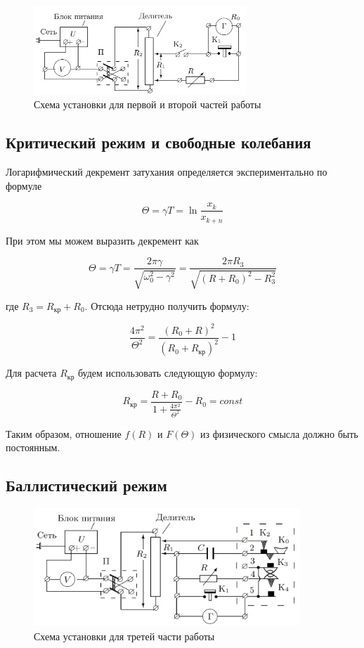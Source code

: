 \documentclass[a4paper,12pt]{article}
\begin{document}
\begin{figure} 
    \includegraphics[width=8cm]{scheme1}
    \caption{Схема установки для первой и второй частей работы}
    \label{chain1}
\end{figure}

\subsection{Критический режим и свободные колебания}

Логарифмический декремент затухания определяется экспериментально по формуле

\begin{equation}\label{Theta}
    \Theta =  \gamma T =  \ln \dfrac{x_k}{x_{k+n}}
\end{equation}

При этом мы можем 
выразить декремент как

\begin{equation}\label{}
    \Theta =  \gamma T =  \dfrac{2\pi\gamma}{\sqrt{\omega_0^2 - \gamma^2}} = \dfrac{2\pi R_3}{\sqrt{(R + R_0)^2 - R_3^2}}
\end{equation}

где $ R_3 = R_{кр} + R_0 $. Отсюда нетрудно получить формулу: 

\begin{equation}\label{}
\dfrac{4\pi^2}{\Theta^2} = \dfrac{(R_0 + R)^2}{(R_0 + R_{кр})^2} - 1
\end{equation}

Для расчета $ R_{кр} $ будем использовать следующую формулу:

\begin{equation}\label{Rkr}
R_\text{кр} = \dfrac{R + R_0}{1 + \frac{4\pi^2}{\Theta^2}} - R_0 = const
\end{equation}
 
 Таким образом, отношение $ f(R) $ и $ F(\Theta) $ из физического смысла должно быть постоянным. 
 
 \subsection{Баллистический режим}
 \begin{figure} 
    \includegraphics[width=10cm]{scheme2}
    \caption{Схема установки для третей части работы}
    \label{chain2}
 \end{figure}
 
\end{document}
